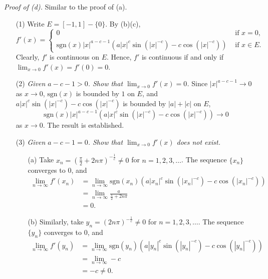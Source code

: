 \documentclass{article}
\begin{document}
\emph{Proof of (d).}
Similar to the proof of (a).
\begin{enumerate}
  \item[(1)]
  Write $E = [-1,1] - \{0\}$.
  By (b)(c),
  \begin{equation*}
  f'(x) =
    \begin{cases}
      0
        & \text{ if } x = 0, \\
      \mathrm{sgn}(x)|x|^{a-c-1} \left( a|x|^{c}\sin(|x|^{-c}) - c\cos(|x|^{-c}) \right)
        & \text{ if } x \in E.
    \end{cases}
  \end{equation*}
  Clearly, $f'$ is continuous on $E$.
  Hence, $f'$ is continuous if and only if $\lim_{x \to 0} f'(x) = f'(0) = 0$.

  \item[(2)]
  \emph{Given $a-c-1 > 0$.
  Show that $\lim_{x \to 0} f'(x) = 0$.}
  Since $|x|^{a-c-1} \to 0$ as $x \to 0$,
  $\mathrm{sgn}(x)$ is bounded by $1$ on $E$, and
  $a|x|^{c}\sin(|x|^{-c}) - c\cos(|x|^{-c})$ is bounded by $|a|+|c|$ on $E$,
  \[
    \mathrm{sgn}(x) |x|^{a-c-1} \left( a|x|^{c}\sin(|x|^{-c}) - c\cos(|x|^{-c}) \right) \to 0
  \]
  as $x \to 0$.
  The result is established.

  \item[(3)]
  \emph{Given $a-c-1 = 0$.
  Show that $\lim_{x \to 0} f'(x)$ does not exist.}
  \begin{enumerate}
    \item[(a)]
    Take $x_n = \left( \frac{\pi}{2} + 2n\pi \right)^{-\frac{1}{c}} \neq 0$
    for $n = 1, 2, 3, \ldots$.
    The sequence $\{ x_n \}$ converges to $0$, and
    \begin{align*}
      \lim_{n \to \infty} f'(x_n)
      &= \lim_{n \to \infty} \mathrm{sgn}(x_n)
        \left( a|x_n|^{c}\sin(|x_n|^{-c}) - c\cos(|x_n|^{-c}) \right) \\
      &= \lim_{n \to \infty} \frac{a}{\frac{\pi}{2} + 2n\pi} \\
      &= 0.
    \end{align*}

    \item[(b)]
    Similarly, take $y_n = \left( 2n\pi \right)^{-\frac{1}{c}} \neq 0$
    for $n = 1, 2, 3, \ldots$.
    The sequence $\{ y_n \}$ converges to $0$, and
    \begin{align*}
      \lim_{n \to \infty} f'(y_n)
      &= \lim_{n \to \infty} \mathrm{sgn}(y_n)
        \left( a|y_n|^{c}\sin(|y_n|^{-c}) - c\cos(|y_n|^{-c}) \right) \\
      &= \lim_{n \to \infty} -c \\
      &= -c \neq 0.
    \end{align*}


\end{enumerate}
\end{enumerate}
\end{document}
